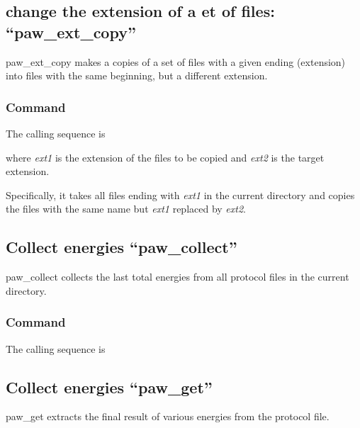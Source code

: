 \documentclass[final,12pt,makeidx,DIV=calc]{article}
\begin{document}
{{{{{{%
\subsection{change the extension  of a et of files: ``paw\_ext\_copy''}
paw\_ext\_copy makes a copies of a set of files with a given ending (extension) into files with the same beginning, but a different extension.


\subsubsection{Command}
The calling sequence is

\bigskip{}\bigskip

\noindent where {\it ext1} is the extension of the files to be
copied and \textit{ext2} is the target extension.

Specifically, it takes all files ending with \textit{ext1} in the
current directory and copies the files with the same name but
\textit{ext1} replaced by \textit{ext2}.

\subsection{Collect energies ``paw\_collect''}
paw\_collect collects the last total energies from all protocol files
in the current directory.

\subsubsection{Command}
The calling sequence is

\bigskip{}

\subsection{Collect energies ``paw\_get''}
paw\_get extracts the final result of various energies from the
protocol file.

}}}}}}
\end{document}
